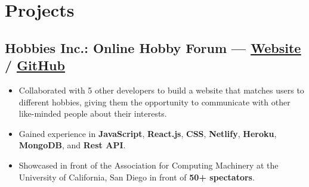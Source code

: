 \documentclass[a4,10pt]{article}
\newenvironment{zitemize}{
\begin{itemize}\itemsep0pt \parskip0pt \parsep1pt}
{\end{itemize}\vspace{-0.5cm}}
\begin{document}
\section{Projects} %



\subsection*{Hobbies Inc.: Online Hobby Forum — {\normalsize\normalfont \href{https://hobbies-inc.netlify.app/}{{\underline{\textcolor{linkblue}{Website}}}} / \href{https://github.com/acmucsd-projects/wi21-dolphin}{{\underline{\textcolor{linkblue}{GitHub}}}}} \hfill} 
\vspace{.05cm}
    \begin{zitemize}
        \item Collaborated with 5 other developers to build a website that matches users to different hobbies, giving them the opportunity to communicate with other like-minded people about their interests.
        \item Gained experience in \textbf{JavaScript}, \textbf{React.js}, \textbf{CSS}, \textbf{Netlify}, \textbf{Heroku}, \textbf{MongoDB}, and \textbf{Rest API}.
        \item Showcased in front of the Association for Computing Machinery at the University of California, San Diego in front of \textbf{50+ spectators}.
    \end{zitemize}


\end{document}
